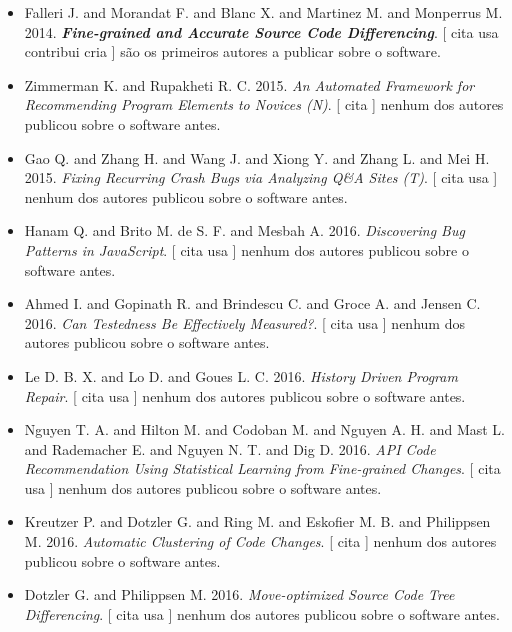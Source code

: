 \begin{itemize}
\item Falleri J. and Morandat F. and Blanc X. and Martinez M. and Monperrus M.
      2014.
        \textbf{\textit{ Fine-grained and Accurate Source Code Differencing}}.
      [
          cita
          usa
          contribui
          cria
      ]
são os primeiros autores a publicar sobre o software.
\item Zimmerman K. and Rupakheti R. C.
      2015.
        \textit{ An Automated Framework for Recommending Program Elements to Novices (N)}.
      [
          cita
      ]
nenhum dos autores publicou sobre o software antes.
\item Gao Q. and Zhang H. and Wang J. and Xiong Y. and Zhang L. and Mei H.
      2015.
        \textit{ Fixing Recurring Crash Bugs via Analyzing Q\&A Sites (T)}.
      [
          cita
          usa
      ]
nenhum dos autores publicou sobre o software antes.
\item Hanam Q. and Brito M. de S. F. and Mesbah A.
      2016.
        \textit{ Discovering Bug Patterns in JavaScript}.
      [
          cita
          usa
      ]
nenhum dos autores publicou sobre o software antes.
\item Ahmed I. and Gopinath R. and Brindescu C. and Groce A. and Jensen C.
      2016.
        \textit{ Can Testedness Be Effectively Measured?}.
      [
          cita
          usa
      ]
nenhum dos autores publicou sobre o software antes.
\item Le D. B. X. and Lo D. and Goues L. C.
      2016.
        \textit{ History Driven Program Repair}.
      [
          cita
          usa
      ]
nenhum dos autores publicou sobre o software antes.
\item Nguyen T. A. and Hilton M. and Codoban M. and Nguyen A. H. and Mast L. and Rademacher E. and Nguyen N. T. and Dig D.
      2016.
        \textit{ API Code Recommendation Using Statistical Learning from Fine-grained Changes}.
      [
          cita
          usa
      ]
nenhum dos autores publicou sobre o software antes.
\item Kreutzer P. and Dotzler G. and Ring M. and Eskofier M. B. and Philippsen M.
      2016.
        \textit{ Automatic Clustering of Code Changes}.
      [
          cita
      ]
nenhum dos autores publicou sobre o software antes.
\item Dotzler G. and Philippsen M.
      2016.
        \textit{ Move-optimized Source Code Tree Differencing}.
      [
          cita
          usa
      ]
nenhum dos autores publicou sobre o software antes.

\end{itemize}
